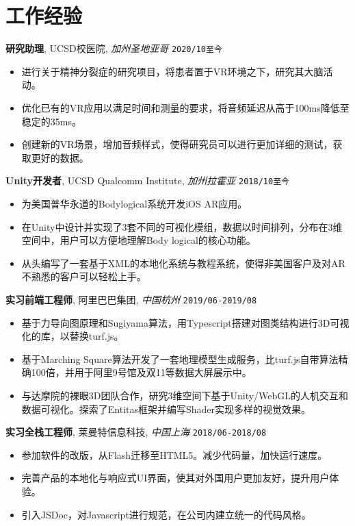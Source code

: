 \documentclass[10pt, letterpaper]{ctexart}
\begin{document}
	\section{工作经验}
	\smallskip
	\textbf{\large 研究助理}, UCSD校医院, \textit{加州圣地亚哥} \hfill \texttt{2020/10至今}
	\begin{itemize}
		\item 进行关于精神分裂症的研究项目，将患者置于VR环境之下，研究其大脑活动。

		\item 优化已有的VR应用以满足时间和测量的要求，将音频延迟从高于100ms降低至稳定的35ms。

		\item 创建新的VR场景，增加音频样式，使得研究员可以进行更加详细的测试，获取更好的数据。

	\end{itemize}
	\textbf{\large Unity开发者}, UCSD Qualcomm Institute, \textit{加州拉霍亚} \hfill \texttt{2018/10至今}
	\begin{itemize}
		\item 为美国普华永道的Bodylogical系统开发iOS AR应用。

		\item 在Unity中设计并实现了3套不同的可视化模组，数据以时间排列，分布在3维空间中，用户可以方便地理解Body logical的核心功能。

		\item 从头编写了一套基于XML的本地化系统与教程系统，使得非美国客户及对AR不熟悉的客户可以轻松上手。

	\end{itemize}
	\textbf{\large 实习前端工程师}, 阿里巴巴集团, \textit{中国杭州} \hfill \texttt{2019/06-2019/08}
	\begin{itemize}
		\item 基于力导向图原理和Sugiyama算法，用Typescript搭建对图类结构进行3D可视化的库，以替换turf.js。

		\item 基于Marching Square算法开发了一套地理模型生成服务，比turf.js自带算法精确100倍，并用于阿里9号馆及双11等数据大屏展示中。

		\item 与达摩院的裸眼3D团队合作，研究3维空间下基于Unity/WebGL的人机交互和数据可视化。探索了Entitas框架并编写Shader实现多样的视觉效果。

	\end{itemize}
	\textbf{\large 实习全栈工程师}, 莱曼特信息科技, \textit{中国上海} \hfill \texttt{2018/06-2018/08}
	\begin{itemize}
		\item 参加软件的改版，从Flash迁移至HTML5。减少代码量，加快运行速度。

		\item 完善产品的本地化与响应式UI界面，使其对外国用户更加友好，提升用户体验。

		\item 引入JSDoc，对Javascript进行规范，在公司内建立统一的代码风格。

	\end{itemize}
\end{document}
